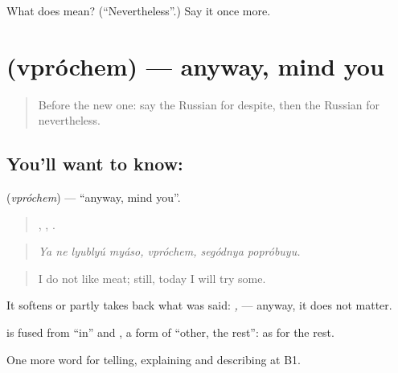 \begin{tcolorbox}[breakable,colback=teal!4,colframe=teal!35!black,title={Before you move on}]
What does    mean? (\textquotedblleft{}Nevertheless\textquotedblright{}.) Say it once more.
\end{tcolorbox}
\section[\texorpdfstring{\ru{впрочем} (vpróchem)}{впрочем (vpróchem)}]{ (vpróchem) — anyway, mind you}

\label{lesson:RU-C356-vprochem}



\begin{quote}
Before the new one: say the Russian for despite, then the Russian for nevertheless.
\end{quote}

\subsection*{You'll want to know: }
\textbf{} (\emph{vpróchem}) — \textquotedblleft{}anyway, mind you\textquotedblright{}.

\begin{quote}
   , ,  .
\end{quote}

\begin{quote}
\emph{Ya ne lyublyú myáso, vpróchem, segódnya popróbuyu.}
\end{quote}

\begin{quote}
I do not like meat; still, today I will try some.
\end{quote}

It softens or partly takes back what was said: \emph{,  } — anyway, it does not matter.

\begin{cousinweb}
\textbf{} is fused from \emph{} \textquotedblleft{}in\textquotedblright{} and \emph{}, a form of \emph{} \textquotedblleft{}other, the rest\textquotedblright{}: as for the rest.
\end{cousinweb}

\begin{grammarlens}[title={What you've built}]
One more word for telling, explaining and describing at B1.
\end{grammarlens}

